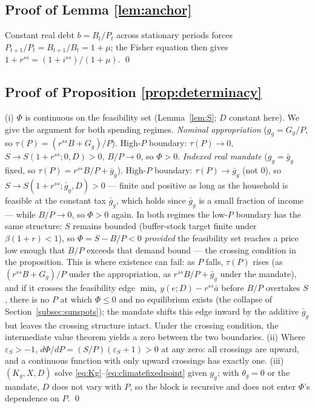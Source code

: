 \documentclass[12pt]{article}
\newcommand{\Sfun}{S}
\begin{document}
\subsection{Proof of Lemma \ref{lem:anchor}}
Constant real debt $b=B_t/P_t$ across stationary periods forces
$P_{t+1}/P_t=B_{t+1}/B_t=1+\mu$; the Fisher equation then gives
$1+r^{ss}=(1+i^{ss})/(1+\mu)$. \qed

\subsection{Proof of Proposition \ref{prop:determinacy}}
(i) $\Phi$ is continuous on the feasibility set (Lemma~\ref{lem:S};
$D$ constant here). We give the argument for both spending regimes.
\emph{Nominal appropriation} ($g_g=G_g/P$, so $\tau(P)=(r^{ss}B+G_g)/P$).
High-$P$ boundary: $\tau(P)\to0$,
$\Sfun\to\Sfun(1+r^{ss};0,D)>0$, $B/P\to0$, so $\Phi>0$. \emph{Indexed real
mandate} ($g_g=\bar g_g$ fixed, so $\tau(P)=r^{ss}B/P+\bar g_g$). High-$P$
boundary: $\tau(P)\to\bar g_g$ (not $0$), so
$\Sfun\to\Sfun(1+r^{ss};\bar g_g,D)>0$ --- finite and positive as long as the
household is feasible at the constant tax $\bar g_g$, which holds since
$\bar g_g$ is a small fraction of income --- while $B/P\to0$, so $\Phi>0$ again.
In both regimes the low-$P$ boundary has the same structure:
$\Sfun$ remains bounded (buffer-stock target finite under $\beta(1+r)<1$),
so $\Phi=\Sfun-B/P<0$ \emph{provided} the feasibility set reaches a price
low enough that $B/P$ exceeds that demand bound --- the crossing condition
in the proposition. This is where existence can fail: as $P$ falls,
$\tau(P)$ rises (as $(r^{ss}B+G_g)/P$ under the appropriation, as
$r^{ss}B/P+\bar g_g$ under the mandate), and if it crosses the feasibility edge
$\min_e y(e;D)-r^{ss}\bar a$ before $B/P$ overtakes $\Sfun$, there is no
$P$ at which $\Phi\le0$ and no equilibrium exists (the collapse of
Section~\ref{subsec:sunspots}); the mandate shifts this edge inward by the
additive $\bar g_g$ but leaves the crossing structure intact. Under the crossing
condition, the intermediate value theorem yields a zero between the two
boundaries. (ii) Where $\varepsilon_S>-1$,
$d\Phi/dP=(\Sfun/P)(\varepsilon_S+1)>0$ at any zero: all crossings are upward,
and a continuous function with only upward crossings has exactly one.
(iii) $(K_g,X,D)$ solve \eqref{eq:Kg}--\eqref{eq:climatefixedpoint} given
$g_g$; with $\theta_g=0$ or the mandate, $D$ does not vary with $P$, so the
block is recursive and does not enter $\Phi$'s dependence on $P$. \qed
\end{document}
